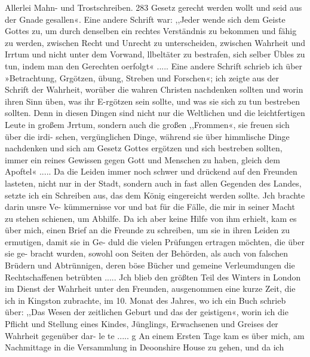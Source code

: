 Allerlei Mahn- und Trostschreiben. 283
Gesetz gerecht werden wollt und seid aus der Gnade gesallen«.
Eine andere Schrift war: ,,Jeder wende sich dem Geiste Gottes
zu, um durch denselben ein rechtes Verständnis zu bekommen und
fähig zu werden, zwischen Recht und Unrecht zu unterscheiden,
zwischen Wahrheit und Irrtum und nicht unter dem Vorwand,
llbeltäter zu bestrafen, sich selber Übles zu tun, indem man den
Gerechten oerfolgt« .....
Eine andere Schrift schrieb ich über »Betrachtung, Grgötzen,
übung, Streben und Forschen«; ich zeigte aus der Schrift der
Wahrheit, worüber die wahren Christen nachdenken sollten und
worin ihren Sinn üben, was ihr E-rgötzen sein sollte, und was sie sich
zu tun bestreben sollten. Denn in diesen Dingen sind nicht nur
die Weltlichen und die leichtfertigen Leute in großem Jrrtum,
sondern auch die großen ,,Frommen«, sie freuen sich über die irdi-
schen, vergünglichen Dinge, während sie über himmlische Dinge
nachdenken und sich am Gesetz Gottes ergötzen und sich bestreben
sollten, immer ein reines Gewissen gegen Gott und Menschen zu
haben, gleich dem Apoftel« .....
Da die Leiden immer noch schwer und drückend auf den
Freunden lasteten, nicht nur in der Stadt, sondern auch in fast
allen Gegenden des Landes, setzte ich ein Schreiben aus, das dem
König eingereicht werden sollte. Jch brachte darin unsre Ve-
kümmernisse vor und bat für die Fälle, die mir in seiner Macht
zu stehen schienen, um Abhilfe. Da ich aber keine Hilfe von
ihm erhielt, kam es über mich, einen Brief an die Freunde zu
schreiben, um sie in ihren Leiden zu ermutigen, damit sie in Ge-
duld die vielen Prüfungen ertragen möchten, die über sie ge-
bracht wurden, sowohl oon Seiten der Behörden, als auch von
falschen Brüdern und Abtrünnigen, deren böse Bücher und gemeine
Verleumdungen die Rechtschaffenen betrübten .....
Jch blieb den größten Teil des Winters in London im Dienst
der Wahrheit unter den Freunden, ausgenommen eine kurze Zeit,
die ich in Kingston zubrachte, im 10. Monat des Jahres, wo ich
ein Buch schrieb über: ,,Das Wesen der zeitlichen Geburt und
das der geistigen«, worin ich die Pflicht und Stellung eines Kindes,
Jünglings, Erwachsenen und Greises der Wahrheit gegenüber dar-
le te .....
g An einem Ersten Tage kam es über mich, am Nachmittage
in die Versammlung in Deoonshire House zu gehen, und da ich


